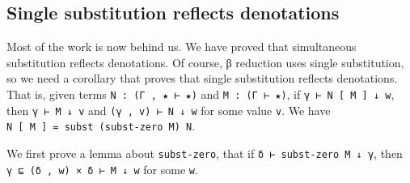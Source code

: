 \hypertarget{single-substitution-reflects-denotations}{%
\subsection{Single substitution reflects
denotations}\label{single-substitution-reflects-denotations}}

Most of the work is now behind us. We have proved that simultaneous
substitution reflects denotations. Of course, β reduction uses single
substitution, so we need a corollary that proves that single
substitution reflects denotations. That is, given terms
\texttt{N\ :\ (Γ\ ,\ ★\ ⊢\ ★)} and \texttt{M\ :\ (Γ\ ⊢\ ★)}, if
\texttt{γ\ ⊢\ N\ {[}\ M\ {]}\ ↓\ w}, then \texttt{γ\ ⊢\ M\ ↓\ v} and
\texttt{(γ\ ,\ v)\ ⊢\ N\ ↓\ w} for some value \texttt{v}. We have
\texttt{N\ {[}\ M\ {]}\ =\ subst\ (subst-zero\ M)\ N}.

We first prove a lemma about \texttt{subst-zero}, that if
\texttt{δ\ ⊢\ subst-zero\ M\ ↓\ γ}, then
\texttt{γ\ ⊑\ (δ\ ,\ w)\ ×\ δ\ ⊢\ M\ ↓\ w} for some \texttt{w}.

